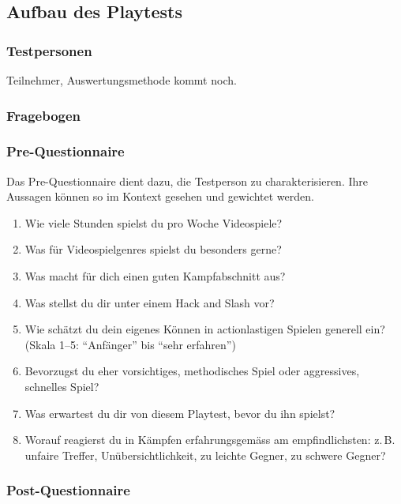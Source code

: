 \documentclass[../Main.tex]{subfiles}
\begin{document}
\subsection{Aufbau des Playtests}

\subsubsection{Testpersonen}
Teilnehmer, Auswertungsmethode kommt noch.

\subsubsection{Fragebogen}

\subsubsection{Pre-Questionnaire} \label{sec:PreQuestionnaire}
 
Das Pre-Questionnaire dient dazu, die Testperson zu charakterisieren. Ihre Aussagen können so im Kontext gesehen und gewichtet werden.
 
\begin{enumerate}[label=\textbf{P\arabic*}, leftmargin=1.5cm, itemsep=0.5em]
    \item Wie viele Stunden spielst du pro Woche Videospiele?
    \item Was für Videospielgenres spielst du besonders gerne?
    \item Was macht für dich einen guten Kampfabschnitt aus?
    \item Was stellst du dir unter einem Hack and Slash vor?
    \item Wie schätzt du dein eigenes Können in actionlastigen Spielen generell ein? (Skala 1--5: \enquote{Anfänger} bis \enquote{sehr erfahren})
    \item Bevorzugst du eher vorsichtiges, methodisches Spiel oder aggressives, schnelles Spiel?
    \item Was erwartest du dir von diesem Playtest, bevor du ihn spielst?
    \item Worauf reagierst du in Kämpfen erfahrungsgemäss am empfindlichsten: z.\,B. unfaire Treffer, Unübersichtlichkeit, zu leichte Gegner, zu schwere Gegner?
\end{enumerate}

\subsubsection{Post-Questionnaire} \label{sec:PostQuestionnaire}
 
\end{document}
